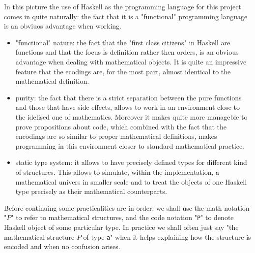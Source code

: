 In this picture the use of Haskell as the programming language for this project comes in quite naturally: the fact that it is a "functional" programming language is an obviuos advantage when working. 


\begin{itemize}
    \item "functional" nature: the fact that the "first class citizens" in Haskell are functions and that the focus is definition rather then orders, is an obvious advantage when dealing with mathematical objects. It is quite an impressive feature that the ecodings are, for the most part, almost identical to the mathematical definition. 
    \item purity: the fact that there is a strict separation between the pure functions and those that have side effects, allows to work in an environment close to the idelised one of mathematics. Moreover it makes quite more manageble to prove propositions about code, which combined with the fact that the encodings are so similar to proper mathematical definitions, makes programming in this environment closer to standard mathematical practice.
    \item static type system: it allows to have precisely defined types for different kind of structures. This allows to simulate, within the implementation, a mathematical univers in smaller scale and to treat the objects of one Haskell type precisely as their mathematical counterparts.  
\end{itemize}


Before continuing some practicalities are in order: we shall use the math notation "$P$" to refer to mathematical structures, and the code notation "\texttt{P}" to denote Haskell object of some particular type. In practice we shall often just say "the mathematical structure $P$ of type \texttt{a}" when it helps explaining how the structure is encoded and when no confusion arises.              
